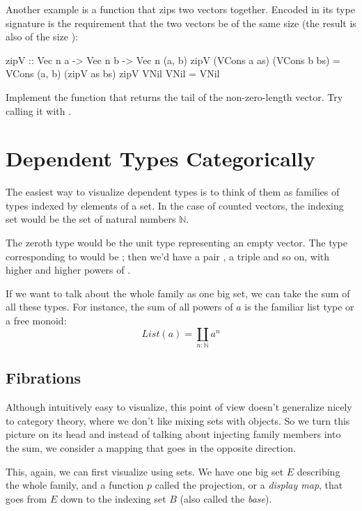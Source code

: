 \documentclass[DaoFP]{subfiles}
\begin{document}
Another example is a function that zips two vectors together. Encoded in its type signature is the requirement that the two vectors be of the same size  (the result is also of the size ):
\begin{haskell}
zipV :: Vec n a -> Vec n b -> Vec n (a, b)
zipV (VCons a as) (VCons b bs) = VCons (a, b) (zipV as bs)
zipV VNil VNil = VNil
\end{haskell}

\begin{exercise}
Implement the function  that returns the tail of the non-zero-length vector. Try calling it with .
\end{exercise}

\section{Dependent Types Categorically}

The easiest way to visualize dependent types is to think of them as families of types indexed by elements of a set. In the case of counted vectors, the indexing set would be the set of natural numbers $\mathbb{N}$.

The zeroth type would be the unit type \hask{()} representing an empty vector. The type corresponding to  would be ; then we'd have a pair , a triple  and so on, with higher and higher powers of .

If we want to talk about the whole family as one big set, we can take the sum of all these types. For instance, the sum of all powers of $a$ is the familiar list type or a free monoid:
\[ \mathit{List} (a) = \coprod_{n:\mathbb{N}} a^n \]

\subsection{Fibrations}

Although intuitively easy to visualize, this point of view doesn't generalize nicely to category theory, where we don't like mixing sets with objects. So we turn this picture on its head and instead of talking about injecting family members into the sum, we consider a mapping that goes in the opposite direction. 

This, again, we can first visualize using sets. We have one big set $E$ describing the whole family, and a function $p$ called the projection, or a \emph{display map}, that goes from $E$ down to the indexing set $B$ (also called the \emph{base}). 
\end{document}
